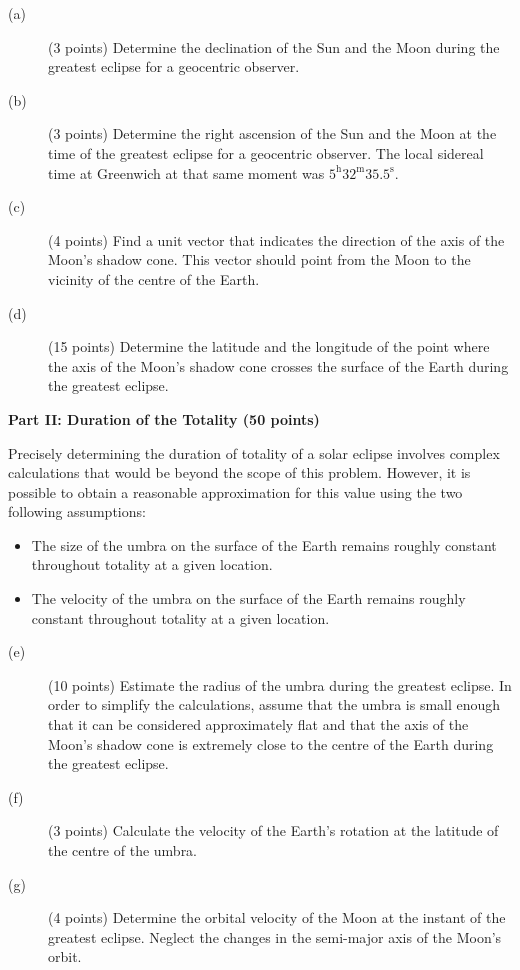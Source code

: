 \begin{description}
\item[(a)] (3 points) Determine the declination of the Sun and the Moon
  during the greatest eclipse for a geocentric observer.
\item[(b)] (3 points) Determine the right ascension of the Sun and the Moon
  at the time of the greatest eclipse for a geocentric observer. The local
  sidereal time at Greenwich at that same moment was
  $5^{\mathrm{h}}32^{\mathrm{m}}35.5^{\mathrm{s}}$.
\item[(c)] (4 points) Find a unit vector that indicates the direction of the
  axis of the Moon's shadow cone. This vector should point from the Moon to
  the vicinity of the centre of the Earth.
\item[(d)] (15 points) Determine the latitude and the longitude of the point
  where the axis of the Moon's shadow cone crosses the surface of the Earth
  during the greatest eclipse.
\end{description}

\textbf{Part II: Duration of the Totality (50 points)}

Precisely determining the duration of totality of a solar eclipse involves
complex calculations that would be beyond the scope of this problem. However,
it is possible to obtain a reasonable approximation for this value using the
two following assumptions:
\begin{itemize}
\item The size of the umbra on the surface of the Earth remains roughly
  constant throughout totality at a given location.
\item The velocity of the umbra on the surface of the Earth remains roughly
  constant throughout totality at a given location.
\end{itemize}

\begin{description}
\item[(e)] (10 points) Estimate the radius of the umbra during the greatest
  eclipse. In order to simplify the calculations, assume that the umbra is
  small enough that it can be considered approximately flat and that the axis
  of the Moon's shadow cone is extremely close to the centre of the Earth
  during the greatest eclipse.
\item[(f)] (3 points) Calculate the velocity of the Earth's rotation at the
  latitude of the centre of the umbra.
\item[(g)] (4 points) Determine the orbital velocity of the Moon at the
  instant of the greatest eclipse. Neglect the changes in the semi-major axis
  of the Moon's orbit.
\end{description}

